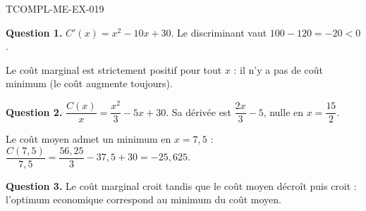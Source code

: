 \begin{corrige}{TCOMPL-ME-EX-019}

\textbf{Question 1.} $C'(x) = x^2 - 10x + 30$. Le discriminant vaut $100 - 120 = -20 < 0$.


Le coût marginal est strictement positif pour tout $x$ : il n'y a pas de coût minimum (le coût augmente toujours).

\textbf{Question 2.} $\dfrac{C(x)}{x} = \dfrac{x^2}{3} - 5x + 30$. Sa dérivée est $\dfrac{2x}{3} - 5$, nulle en $x = \dfrac{15}{2}$.

Le coût moyen admet un minimum en $x = 7{,}5$ : $\dfrac{C(7{,}5)}{7{,}5} = \dfrac{56{,}25}{3} - 37{,}5 + 30 = -25{,}625$.

\textbf{Question 3.} Le coût marginal croit tandis que le coût moyen décroît puis croit : l'optimum economique correspond au minimum du coût moyen.

\end{corrige}
